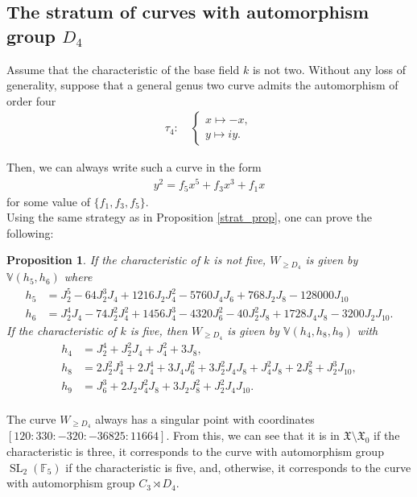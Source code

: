 \documentclass{amsart}
\newcommand{\SL}{\operatorname{SL}}
\numberwithin{equation}{section}
\newtheorem{proposition}[theorem]{Proposition}
\theoremstyle{definition}
\theoremstyle{remark}
\begin{document}
\subsection{The stratum of curves with automorphism group \texorpdfstring{$D_4$}{D4}}
Assume that the characteristic of the base field $k$ is not two. Without any loss of generality, suppose that a general genus two curve admits the automorphism of order four
\begin{align*}
\tau_4\colon\quad\begin{cases}
    x\mapsto -x,\\
    y\mapsto iy.
    \end{cases}
\end{align*}

Then, we can always write such a curve in the form
\begin{align*}
y^2=f_5x^5+f_3x^3+f_1x 
\end{align*}
for some value of $\{f_1,f_3,f_5\}$.\\

Using the same strategy as in Proposition \ref{strat_prop}, one can prove the following:

\begin{proposition} \label{D4_prop}
If the characteristic of $k$ is not five, $W_{\geq D_4}$ is given by $\mathbb{V}(h_5,h_6)$ where
\begin{align*}
h_5&=J_2^5 - 64J_2^3J_4 + 1216J_2J_4^2 - 5760J_4J_6 + 768J_2J_8 - 128000J_{10}\\
h_6&=J_2^4J_4 - 74J_2^2J_4^2 + 1456J_4^3 - 4320J_6^2 - 40J_2^2J_8 + 1728J_4J_8 - 3200J_2J_{10}.
\end{align*}
If the characteristic of $k$ is five, then $W_{\geq D_4}$ is given by $\mathbb{V}(h_4,h_8,h_9)$ with
\begin{align*}
    h_4&=J_2^4 + J_2^2J_4 + J_4^2 + 3J_8,\\
    h_8&=2J_2^2J_4^3 + 2J_4^4 + 3J_4J_6^2 + 3J_2^2J_4J_8 + J_4^2J_8 + 2J_8^2 + J_2^3J_{10},\\
    h_9&=J_6^3 + 2J_2J_4^2J_8 + 3J_2J_8^2 + J_2^2J_4J_{10}.\\
\end{align*}
\end{proposition}

The curve $W_{\geq D_4}$ always has a singular point with coordinates $[120: 330: -320:-36825: 11664]$. From this, we can see that it is in $\mathfrak{X}\setminus \mathfrak{X}_0$ if the characteristic is three, it corresponds to the curve with automorphism group $\SL_2(\mathbb{F}_5)$ if the characteristic is five, and, otherwise, it corresponds to the curve with automorphism group $C_3\rtimes D_4$.\\
\end{document}
